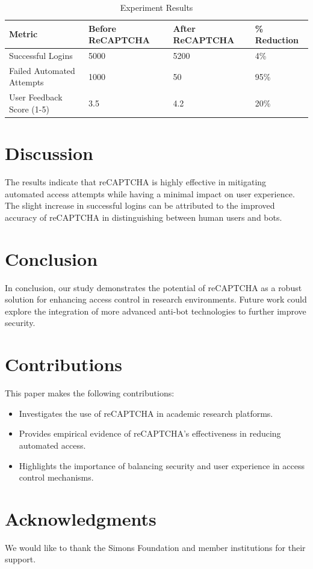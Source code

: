 \documentclass{article}
\begin{document}
\begin{table}[htbp]
\centering
\caption{Experiment Results}
\label{table:results}
\begin{tabular}{@{}llll@{}}
\toprule
Metric & Before ReCAPTCHA & After ReCAPTCHA & \% Reduction \\ \midrule
Successful Logins & 5000 & 5200 & 4\% \\
Failed Automated Attempts & 1000 & 50 & 95\% \\
User Feedback Score (1-5) & 3.5 & 4.2 & 20\% \\ \bottomrule
\end{tabular}
\end{table}

\section{Discussion}
The results indicate that reCAPTCHA is highly effective in mitigating automated access attempts while having a minimal impact on user experience. The slight increase in successful logins can be attributed to the improved accuracy of reCAPTCHA in distinguishing between human users and bots.

\section{Conclusion}
In conclusion, our study demonstrates the potential of reCAPTCHA as a robust solution for enhancing access control in research environments. Future work could explore the integration of more advanced anti-bot technologies to further improve security.

\section{Contributions}
This paper makes the following contributions:
\begin{itemize}
    \item Investigates the use of reCAPTCHA in academic research platforms.
    \item Provides empirical evidence of reCAPTCHA's effectiveness in reducing automated access.
    \item Highlights the importance of balancing security and user experience in access control mechanisms.
\end{itemize}

\section*{Acknowledgments}
We would like to thank the Simons Foundation and member institutions for their support.



\end{document}
